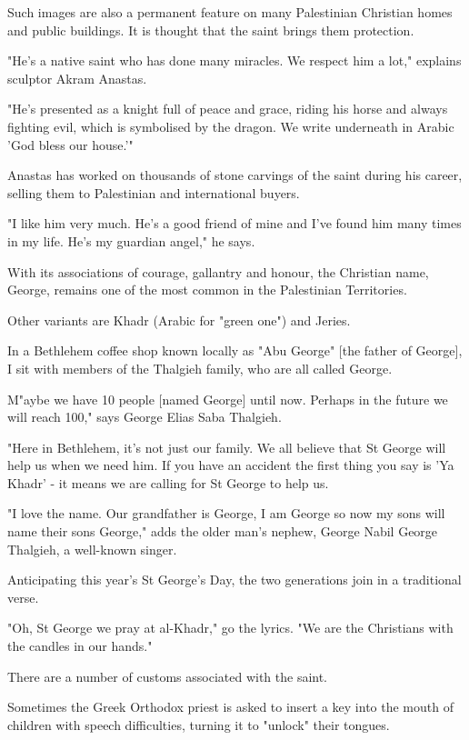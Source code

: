 \documentclass[letterpaper]{report}
\begin{document}
\begin{multicols}{2}
Such images are also a permanent feature on many Palestinian Christian homes and public buildings. It is thought that the saint brings them protection.

"He's a native saint who has done many miracles. We respect him a lot," explains sculptor Akram Anastas.

"He's presented as a knight full of peace and grace, riding his horse and always fighting evil, which is symbolised by the dragon. We write underneath in Arabic 'God bless our house.'"

Anastas has worked on thousands of stone carvings of the saint during his career, selling them to Palestinian and international buyers.

"I like him very much. He's a good friend of mine and I've found him many times in my life. He's my guardian angel," he says.


With its associations of courage, gallantry and honour, the Christian name, George, remains one of the most common in the Palestinian Territories.

Other variants are Khadr (Arabic for "green one") and Jeries.

In a Bethlehem coffee shop known locally as "Abu George" [the father of George], I sit with members of the Thalgieh family, who are all called George.

M"aybe we have 10 people [named George] until now. Perhaps in the future we will reach 100," says George Elias Saba Thalgieh.

"Here in Bethlehem, it's not just our family. We all believe that St George will help us when we need him. If you have an accident the first thing you say is 'Ya Khadr' - it means we are calling for St George to help us.

"I love the name. Our grandfather is George, I am George so now my sons will name their sons George," adds the older man's nephew, George Nabil George Thalgieh, a well-known singer.

Anticipating this year's St George's Day, the two generations join in a traditional verse.

"Oh, St George we pray at al-Khadr," go the lyrics. "We are the Christians with the candles in our hands."

There are a number of customs associated with the saint.

Sometimes the Greek Orthodox priest is asked to insert a key into the mouth of children with speech difficulties, turning it to "unlock" their tongues.


\end{multicols}
\end{document}

